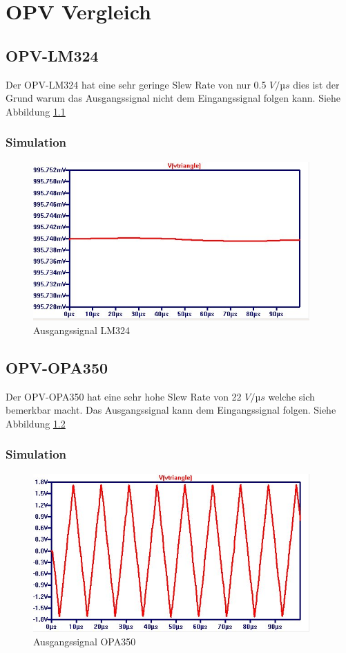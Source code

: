\documentclass[11pt,a4paper,bibtotoc,oneside]{scrbook}
\begin{document}
\chapter{OPV Vergleich}
\section{OPV-LM324}
Der OPV-LM324 hat eine sehr geringe Slew Rate von nur 0.5 $V/µs$ dies ist der Grund warum das Ausgangssignal nicht dem
Eingangssignal folgen kann. Siehe Abbildung \textcolor{blue}{\ref{lm324}}
\subsection{Simulation}
    \begin{figure}[h]
    \centering
        \includegraphics[width=300pt]{./picture/LM324_triangle.png}
        \caption{\label{lm324}{Ausgangssignal LM324}}
    \end{figure}
\section{OPV-OPA350}
Der OPV-OPA350 hat eine sehr hohe Slew Rate von 22 $V/µs$ welche sich bemerkbar macht. Das Ausgangssignal kann dem
Eingangssignal folgen. Siehe Abbildung \textcolor{blue}{\ref{opa324}}
\subsection{Simulation}
\begin{figure}[h]
\centering
    \includegraphics[width=300pt]{./picture/OPA350_triangle.png}
    \caption{\label{opa324}Ausgangssignal OPA350}
\end{figure}
\end{document}
